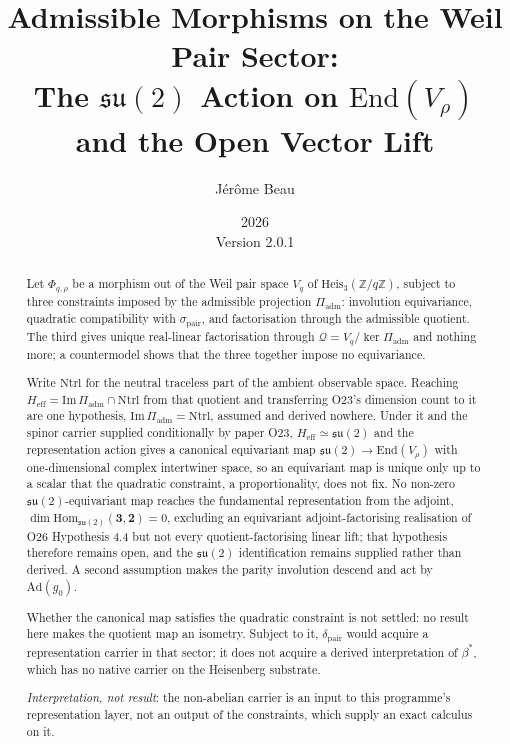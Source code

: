 \documentclass[11pt,a4paper]{article}
\title{Admissible Morphisms on the Weil Pair Sector:\\
The $\mathfrak{su}(2)$ Action on $\mathrm{End}(V_\rho)$ and the Open Vector Lift}
\author{J\'er\^ome Beau}
\date{2026\\[2pt]\small Version 2.0.1}
\theoremstyle{remark}
\begin{document}
  \maketitle

  \begin{abstract}
    Let $\Phi_{q,\rho}$ be a morphism out of the Weil pair space $V_q$ of
    $\mathrm{Heis}_3(\mathbb{Z}/q\mathbb{Z})$, subject to three constraints imposed by the
    admissible projection $\Pi_{\mathrm{adm}}$: involution equivariance, quadratic compatibility
    with $\sigma_{\mathrm{pair}}$, and factorisation through the admissible quotient.
    The third gives unique real-linear factorisation through
    $\mathcal{Q} = V_q / \ker \Pi_{\mathrm{adm}}$ and nothing more; a countermodel shows that the
    three together impose no equivariance.

    Write $\mathrm{Ntrl}$ for the neutral traceless part of the ambient observable space.
    Reaching $H_{\mathrm{eff}} = \mathrm{Im}\,\Pi_{\mathrm{adm}} \cap \mathrm{Ntrl}$ from that
    quotient and transferring O23's dimension count to it are one hypothesis,
    $\mathrm{Im}\,\Pi_{\mathrm{adm}} = \mathrm{Ntrl}$, assumed and derived nowhere.
    Under it and the spinor carrier supplied conditionally by paper O23, $H_{\mathrm{eff}} \simeq
    \mathfrak{su}(2)$ and the representation action gives a canonical equivariant map
    $\mathfrak{su}(2) \to \mathrm{End}(V_\rho)$ with one-dimensional complex intertwiner space, so
    an equivariant map is unique only up to a scalar that the quadratic constraint, a
    proportionality, does not fix.
    No non-zero $\mathfrak{su}(2)$-equivariant map reaches the fundamental representation from the
    adjoint, $\dim \mathrm{Hom}_{\mathfrak{su}(2)}(\mathbf{3},\mathbf{2}) = 0$, excluding an
    equivariant adjoint-factorising realisation of O26 Hypothesis 4.4 but not every
    quotient-factorising linear lift; that hypothesis therefore remains open, and the
    $\mathfrak{su}(2)$ identification remains supplied rather than derived.
    A second assumption makes the parity involution descend and act by $\mathrm{Ad}(g_0)$.

    Whether the canonical map satisfies the quadratic constraint is not settled: no result here
    makes the quotient map an isometry.
    Subject to it, $\delta_{\mathrm{pair}}$ would acquire a representation carrier in that sector;
    it does not acquire a derived interpretation of $\beta^*$, which has no native carrier on the
    Heisenberg substrate.

    \emph{Interpretation, not result}: the non-abelian carrier is an input to this programme's
    representation layer, not an output of the constraints, which supply an exact calculus on it.
  \end{abstract}
\end{document}
